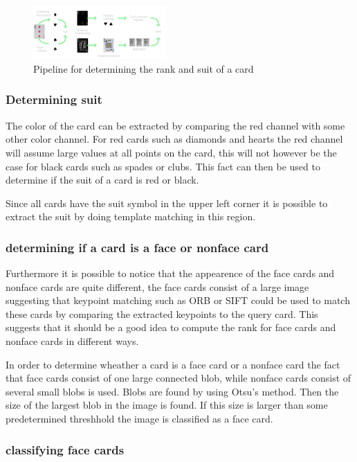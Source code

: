 \documentclass[journal,twoside]{IEEEtran}
\begin{document}
\begin{figure}[placement h]
\centering
\includegraphics[width=0.45\textwidth]{images/recognition.png}
\caption{Pipeline for determining the rank and suit of a card}
\label{fig:RankSuitOutline}
\end{figure}

\subsubsection{Determining suit}

The color of the card can be extracted by comparing the red channel with some other color channel. For red cards such as diamonds and hearts the red channel will assume large values at all points on the card, this will not however be the case for black cards such as spades or clubs. This fact can then be used to determine if the suit of a card is red or black.

Since all cards have the suit symbol in the upper left corner it is possible to extract the suit by doing template matching in this region.

\subsubsection{determining if a card is a face or nonface card}

Furthermore it is possible to notice that the appearence of the face cards and nonface cards are quite different, the face cards consist of a large image suggesting that keypoint matching such as ORB or SIFT could be used to match these cards by comparing the extracted keypoints to the query card. This suggests that it should be a good idea to compute the rank for face cards and nonface cards in different ways.

In order to determine wheather a card is a face card or a nonface card the fact that face cards consist of one large connected blob, while nonface cards consist of several small blobs is used. Blobs are found by using Otsu's method. Then the size of the largest blob in the image is found. If this size is larger than some predetermined threshhold the image is classified as a face card.

\subsubsection{classifying face cards}
\end{document}
